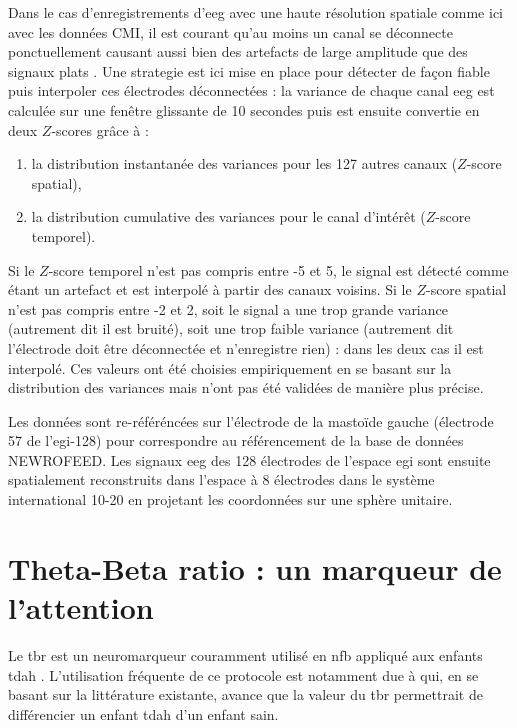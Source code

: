 Dans le cas d'enregistrements d'\gls{eeg} avec une haute résolution spatiale comme ici avec les données CMI, 
il est courant qu'au moins un canal se déconnecte ponctuellement causant aussi bien des artefacts de large amplitude que des signaux plats \citep{Barlow1986, Oregan2013}. 
Une strategie est ici mise en place pour détecter de façon fiable puis interpoler ces électrodes déconnectées : la variance de chaque canal 
\gls{eeg} est calculée sur une fenêtre glissante de 10 secondes puis est ensuite convertie en deux $Z$-scores grâce à :
\begin{enumerate}
\item la distribution instantanée des variances pour les 127 autres canaux ($Z$-score spatial),
\item la distribution cumulative des variances pour le canal d'intérêt ($Z$-score temporel).
\end{enumerate}
Si le $Z$-score temporel n'est pas compris entre -5 et 5, le signal est détecté comme étant un artefact et est interpolé à partir des canaux voisins.
Si le $Z$-score spatial n'est pas compris entre -2 et 2, soit le signal a une trop grande variance (autrement dit il est bruité), soit une trop faible
variance (autrement dit l'électrode doit être déconnectée et n'enregistre rien) : dans les deux cas il est interpolé. Ces valeurs ont été choisies
empiriquement en se basant sur la distribution des variances mais n'ont pas été validées de manière plus précise.  

Les données sont re-référéncées sur l'électrode de la mastoïde gauche (électrode 57 de l'\gls{egi}-128) pour correspondre au référencement de la base
de données NEWROFEED. Les signaux \gls{eeg} des 128 électrodes de l'espace \gls{egi} sont ensuite spatialement reconstruits dans l'espace à 8 électrodes 
dans le système international 10-20 en projetant les coordonnées sur une sphère unitaire.


\section{Theta-Beta ratio : un marqueur de l'attention}

Le \gls{tbr} est un neuromarqueur couramment utilisé en \gls{nfb} appliqué aux enfants \gls{tdah} \citep{Arns2013}. L'utilisation fréquente de ce protocole est notamment due
à \citet{Lubar1991} qui, en se basant sur la littérature existante, avance que la valeur du \gls{tbr} permettrait de différencier un enfant \gls{tdah} d'un enfant sain.  

